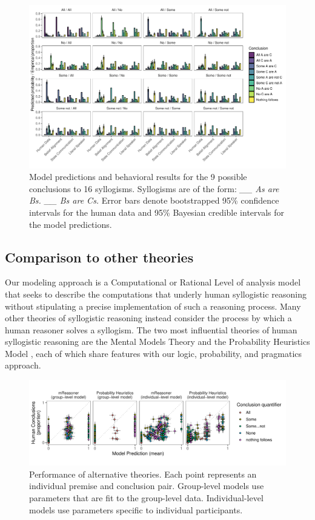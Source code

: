 \documentclass[floatsintext, man]{apa6}
\begin{document}
\begin{figure}[t]
\centering
\includegraphics[width = \textwidth]{bda_rsa_bars_0params.pdf}
\caption{Model predictions and behavioral results for the 9 possible conclusions to 16 syllogisms. Syllogisms are of the form: \emph{\_\_ As are Bs. \_\_ Bs are Cs.} Error bars denote bootstrapped 95\% confidence intervals for the human data and 95\% Bayesian credible intervals for the model predictions.}
\label{fig:bars}
\end{figure}




\subsection{Comparison to other theories}

Our modeling approach is a Computational or Rational Level of analysis model \cite{marr1982vision, anderson1990adaptive} that seeks to describe the computations that underly human syllogistic reasoning without stipulating a precise implementation of such a reasoning process. 
Many other theories of syllogistic reasoning instead consider the process by which a human reasoner solves a syllogism.
The two most influential theories of human syllogistic reasoning are the Mental Models Theory \cite{johnsonlaird2006we, khemlani2013processes} and the Probability Heuristics Model \cite{Chater1999}, each of which share features with our logic, probability, and pragmatics approach. 


\begin{figure}[t]
\centering
\includegraphics[width = \textwidth]{alternative_model_scatters.pdf}
\caption{Performance of alternative theories. Each point represents an individual premise and conclusion pair. Group-level models use parameters that are fit to the group-level data. Individual-level models use parameters specific to individual participants. }
\label{fig:altModels}
\end{figure}
\end{document}
